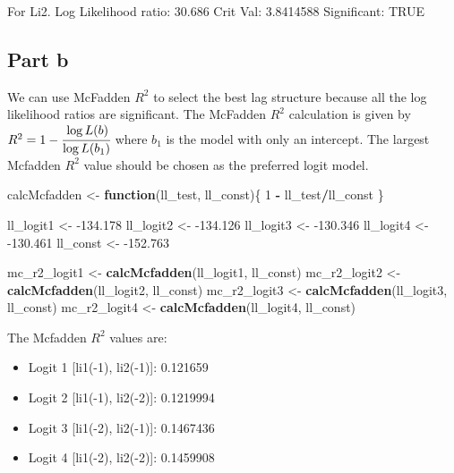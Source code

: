 \documentclass[]{article}
\newenvironment{Shaded}{\begin{snugshade}}{\end{snugshade}}
\newcommand{\ControlFlowTok}[1]{\textcolor[rgb]{0.13,0.29,0.53}{\textbf{#1}}}
\newcommand{\DecValTok}[1]{\textcolor[rgb]{0.00,0.00,0.81}{#1}}
\newcommand{\FloatTok}[1]{\textcolor[rgb]{0.00,0.00,0.81}{#1}}
\newcommand{\KeywordTok}[1]{\textcolor[rgb]{0.13,0.29,0.53}{\textbf{#1}}}
\newcommand{\NormalTok}[1]{#1}
\newcommand{\OperatorTok}[1]{\textcolor[rgb]{0.81,0.36,0.00}{\textbf{#1}}}
\newcommand{\StringTok}[1]{\textcolor[rgb]{0.31,0.60,0.02}{#1}}
\providecommand{\tightlist}{%
  \setlength{\itemsep}{0pt}\setlength{\parskip}{0pt}}
\begin{document}
For Li2. Log Likelihood ratio: 30.686 Crit Val: 3.8414588 Significant:
TRUE

\hypertarget{part-b}{%
\subsection{Part b}\label{part-b}}

We can use McFadden \(R^{2}\) to select the best lag structure because
all the log likelihood ratios are significant. The McFadden \(R^{2}\)
calculation is given by
\(R^{2} = 1 - \cfrac{\log{L(b)}}{\log{L(b_{1})}}\) where \(b_{1}\) is
the model with only an intercept. The largest Mcfadden \(R^{2}\) value
should be chosen as the preferred logit model.

\begin{Shaded}
\begin{Highlighting}[]
\NormalTok{calcMcfadden <-}\StringTok{ }\ControlFlowTok{function}\NormalTok{(ll_test, ll_const)\{}
  \DecValTok{1} \OperatorTok{-}\StringTok{ }\NormalTok{ll_test}\OperatorTok{/}\NormalTok{ll_const}
\NormalTok{\}}

\NormalTok{ll_logit1 <-}\StringTok{ }\FloatTok{-134.178}
\NormalTok{ll_logit2 <-}\StringTok{ }\FloatTok{-134.126}
\NormalTok{ll_logit3 <-}\StringTok{ }\FloatTok{-130.346}
\NormalTok{ll_logit4 <-}\StringTok{ }\FloatTok{-130.461}
\NormalTok{ll_const <-}\StringTok{ }\FloatTok{-152.763}

\NormalTok{mc_r2_logit1 <-}\StringTok{ }\KeywordTok{calcMcfadden}\NormalTok{(ll_logit1, ll_const)}
\NormalTok{mc_r2_logit2 <-}\StringTok{ }\KeywordTok{calcMcfadden}\NormalTok{(ll_logit2, ll_const)}
\NormalTok{mc_r2_logit3 <-}\StringTok{ }\KeywordTok{calcMcfadden}\NormalTok{(ll_logit3, ll_const)}
\NormalTok{mc_r2_logit4 <-}\StringTok{ }\KeywordTok{calcMcfadden}\NormalTok{(ll_logit4, ll_const)}
\end{Highlighting}
\end{Shaded}

The Mcfadden \(R^{2}\) values are:

\begin{itemize}
\tightlist
\item
  Logit 1 {[}li1(-1), li2(-1){]}: 0.121659
\item
  Logit 2 {[}li1(-1), li2(-2){]}: 0.1219994
\item
  Logit 3 {[}li1(-2), li2(-1){]}: 0.1467436
\item
  Logit 4 {[}li1(-2), li2(-2){]}: 0.1459908
\end{itemize}
\end{document}
